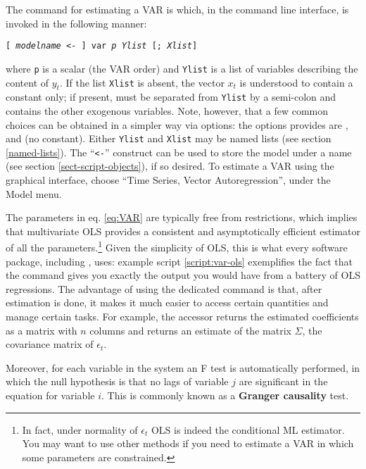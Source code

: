 The  command for estimating a VAR is  which, in
the command line interface, is invoked in the following manner:
\begin{flushleft}
    \texttt{[ \emph{modelname} \textless - ] var \emph{p} \emph{Ylist} [;
    \emph{Xlist}]}
\end{flushleft}
where \texttt{p} is a scalar (the VAR order) and \texttt{Ylist} is a
list of variables describing the content of $y_t$. If the list
\texttt{Xlist} is absent, the vector $x_t$ is understood to contain a
constant only; if present, must be separated from \texttt{Ylist} by a
semi-colon and contains the other exogenous variables. Note, however,
that a few common choices can be obtained in a simpler way via
options: the options  provides are ,
 and  (no constant). Either
\texttt{Ylist} and \texttt{Xlist} may be named lists (see section
\ref{named-lists}). The ``\texttt{\textless -}'' construct can be used
to store the model under a name (see section
\ref{sect-script-objects}), if so desired. To estimate a VAR using the
graphical interface, choose ``Time Series, Vector Autoregression'',
under the Model menu.

The parameters in eq. \eqref{eq:VAR} are typically free from
restrictions, which implies that multivariate OLS provides a
consistent and asymptotically efficient estimator of all the
parameters.\footnote{In fact, under normality of $\epsilon_t$ OLS is
  indeed the conditional ML estimator. You may want to use other
  methods if you need to estimate a VAR in which some parameters are
  constrained.}  Given the simplicity of OLS, this is what every
software package, including , uses: example script
\ref{script:var-ols} exemplifies the fact that the  command
gives you exactly the output you would have from a battery of OLS
regressions. The advantage of using the dedicated command is that,
after estimation is done, it makes it much easier to access certain
quantities and manage certain tasks. For example, the 
accessor returns the estimated coefficients as a matrix with $n$
columns and  returns an estimate of the matrix $\Sigma$,
the covariance matrix of $\epsilon_t$. 

Moreover, for each variable in the system an F test is automatically
performed, in which the null hypothesis is that no lags of variable
$j$ are significant in the equation for variable $i$. This is commonly
known as a \textbf{Granger causality} test.


